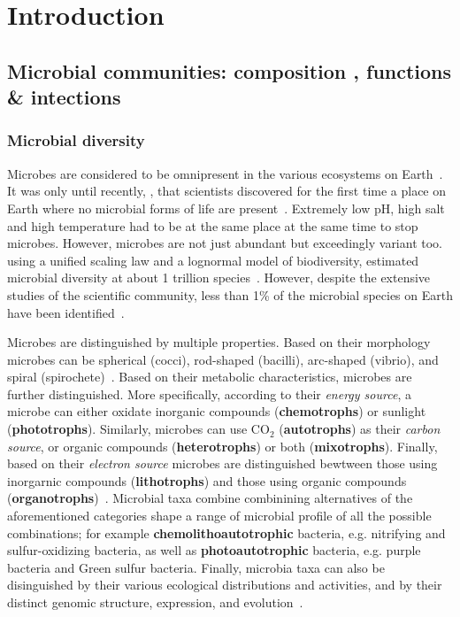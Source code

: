 \chapter{Introduction}
\label{cha:intro}



\section{Microbial communities: composition 
, functions 
\& intections 
}


   \subsection{Microbial diversity}
   Microbes are considered to be omnipresent in the 
   various ecosystems on Earth~\citep{falkowski2008microbial}.
   It was only until recently, \citeyear{belilla2019hyperdiverse}, that scientists discovered for the first time 
   a place on Earth where no microbial forms of life are present~\cite{belilla2019hyperdiverse}.
   Extremely low pH, high salt and high temperature had to be 
   at the same place at the same time to stop microbes.
   However, microbes are not just abundant but 
   exceedingly variant too.
   \citeauthor{locey2016scaling} using a unified scaling law
   and a lognormal model of biodiversity, 
   estimated microbial diversity at about 1 trillion species~\cite{locey2016scaling}.
   However, despite the extensive studies of the scientific community, 
   less than 1\% of the microbial species on Earth have been identified~\cite{isme}.
   
   Microbes are distinguished by multiple properties.
   Based on their morphology microbes can be spherical (cocci), rod-shaped (bacilli),
   arc-shaped (vibrio), and spiral (spirochete)~\cite{dunlap2001microbial}.
   Based on their metabolic characteristics, microbes are further distinguished. 
   More specifically, according to their \textit{energy source}, a microbe
   can either oxidate inorganic compounds (\textbf{chemotrophs}) or sunlight (\textbf{phototrophs}).
   Similarly, microbes can use CO$_2$ (\textbf{autotrophs}) as their \textit{carbon source},
   or organic compounds (\textbf{heterotrophs}) or both (\textbf{mixotrophs}).
   Finally, based on their \textit{electron source} 
   microbes are distinguished bewtween those using inorgarnic compounds (\textbf{lithotrophs}) and those using organic compounds (\textbf{organotrophs})~\cite{madigan2018brock}.
   Microbial taxa combine combinining alternatives of the aforementioned categories 
   shape a range of microbial profile of all the possible combinations; for example      \textbf{chemolithoautotrophic} bacteria, 
   e.g. nitrifying and sulfur-oxidizing bacteria, as well
   as \textbf{photoautotrophic} bacteria, 
   e.g. purple bacteria and Green sulfur bacteria. 
   Finally, microbia taxa can also be disinguished by their various ecological distributions and activities, 
   and by their distinct genomic structure, expression, and evolution~\cite{dunlap2001microbial}. 

